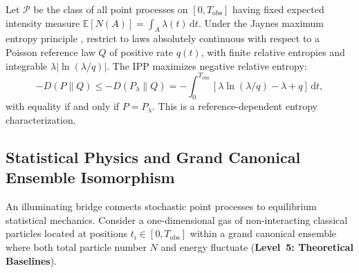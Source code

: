 \begin{theorem}
  \label{thm:max_entropy_ipp}
  Let $\mathcal{P}$ be the class of all point processes on $[0,
  T_{\mathrm{obs}}]$ having fixed expected intensity measure
  $\mathbb{E}[N(A)] = \int_A \lambda(t) \, \mathrm{d}t$. Under the
  Jaynes maximum entropy principle \parencite{jaynes1957}, restrict to
  laws absolutely continuous with respect to a Poisson reference law
  $Q$ of positive rate $q(t)$, with finite relative entropies and
  integrable $\lambda|\ln(\lambda/q)|$. The \ac{IPP} maximizes
  negative relative entropy:
  \begin{equation}
    -D(P\parallel Q)\le-D(P_\lambda\parallel Q)
    =-\int_0^{T_{\mathrm{obs}}}
    [\lambda\ln(\lambda/q)-\lambda+q]\,\mathrm{d}t,
    \label{eq:max_entropy_bound}
  \end{equation}
  with equality if and only if $P=P_\lambda$. This is a
  reference-dependent entropy characterization.
\end{theorem}

\subsection{Statistical Physics and Grand Canonical Ensemble Isomorphism}
\label{subsec:grand_canonical_isomorphism}

An illuminating bridge connects stochastic point processes to
equilibrium statistical mechanics. Consider a one-dimensional gas of
non-interacting classical particles located at positions $t_i \in
[0, T_{\mathrm{obs}}]$ within a grand canonical ensemble where both
total particle number $N$ and energy fluctuate (\textbf{Level~5:
Theoretical Baselines}).

